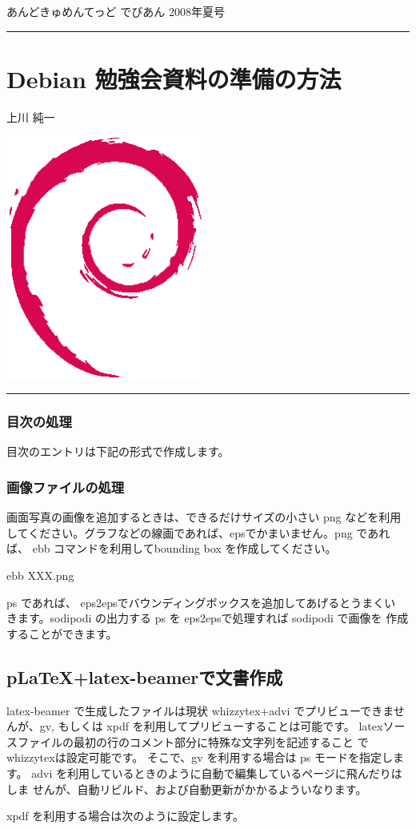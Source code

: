 \documentclass[mingoth,a4paper]{jsarticle}
\renewcommand{\dancersection}[2]{%
\newpage
あんどきゅめんてっど でびあん 2008年夏号
%
\vspace{0.1mm}\\
{\color{dancerlightblue}\rule{\hsize}{2mm}}

%
%
\begin{minipage}[t]{0.6\hsize}
\color{dancerdarkblue}
\vspace{1cm}
\section{#1}
\hfill{}#2\\
\end{minipage}
\begin{minipage}[t]{0.4\hsize}
\vspace{-2cm}
\hfill{}\includegraphics[height=8cm]{image200502/openlogo-nd.eps}\\
\vspace{-5cm}
\end{minipage}
%
%
{\color{dancerdarkblue}\rule{0.74\hsize}{2mm}}
%
\vspace{2cm}
}
\begin{document}
\begin{commandline}
 \dancersection{Debian 勉強会資料の準備の方法}{上川 純一}
 \label{sec:debmtg2007howtoprepare}
\end{commandline}

\subsubsection{目次の処理}

目次のエントリは下記の形式で作成します。
\begin{commandline}
\end{commandline}

\subsubsection{画像ファイルの処理}

画面写真の画像を追加するときは、できるだけサイズの小さい png などを利用
してください。グラフなどの線画であれば、epsでかまいません。png であれば、 
ebb コマンドを利用してbounding box を作成してください。

\begin{commandline}
 ebb XXX.png
\end{commandline}

ps であれば、 eps2epsでバウンディングボックスを追加してあげるとうまくい
きます。sodipodi の出力する ps を eps2epsで処理すれば sodipodi で画像を
作成することができます。

\subsection{pLaTeX+latex-beamerで文書作成}

latex-beamer で生成したファイルは現状 whizzytex+advi でプリビューできませ
んが、gv, もしくは xpdf を利用してプリビューすることは可能です。
latexソースファイルの最初の行のコメント部分に特殊な文字列を記述すること
でwhizzytexは設定可能です。
そこで、gv を利用する場合は ps モードを指定します。
advi を利用しているときのように自動で編集しているページに飛んだりはしま
せんが、自動リビルド、および自動更新がかかるよういなります。

\begin{commandline}
\end{commandline}

xpdf を利用する場合は次のように設定します。

\begin{commandline}
\end{commandline}
\end{document}
